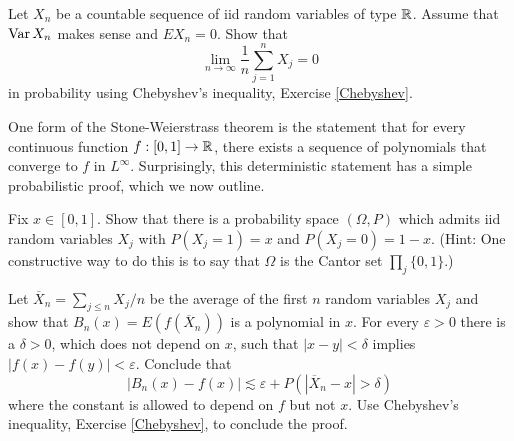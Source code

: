 \begin{exercise}
Let $X_{n}$ be a countable sequence of iid random variables of type $\mathbb{R}$.
Assume that $\operatorname{Var} X_{n}$ makes sense and $EX_{n} = 0$. Show that
\[\lim_{n \to \infty} \frac{1}{n} \sum_{j=1}^{n} X_{j} = 0\]
in probability using Chebyshev's inequality, Exercise \ref{Chebyshev}.
\end{exercise}

\begin{exercise}
One form of the Stone-Weierstrass theorem is the statement that for every continuous function $f: [0, 1] \to \mathbb{R}$, there exists a sequence of polynomials that converge to $f$ in $L^\infty$.
Surprisingly, this deterministic statement has a simple probabilistic proof, which we now outline.

Fix $x \in [0, 1]$.
Show that there is a probability space $(\Omega, P)$ which admits iid random variables $X_{j}$ with $P(X_{j} = 1) = x$ and $P(X_{j} = 0) = 1 - x$.
(Hint: One constructive way to do this is to say that $\Omega$ is the Cantor set $\prod_{j} \{0, 1\}$.)

Let $\overline X_{n} = \sum_{j \leq n} X_{j}/n$ be the average of the first $n$ random variables $X_{j}$ and show that $B_{n}(x) = E(f(\overline X_{n}))$ is a polynomial in $x$.
For every $\varepsilon > 0$ there is a $\delta > 0$, which does not depend on $x$, such that $|x - y| < \delta$ implies $|f(x) - f(y)| < \varepsilon$.
Conclude that
\[|B_{n}(x) - f(x)| \lesssim \varepsilon + P(|\overline X_{n} - x| > \delta)\]
where the constant is allowed to depend on $f$ but not $x$.
Use Chebyshev's inequality, Exercise \ref{Chebyshev}, to conclude the proof.
\end{exercise}
